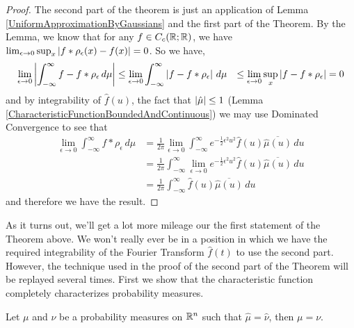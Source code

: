 \begin{proof}
The second part of the theorem is just an application of Lemma
\ref{UniformApproximationByGaussians} and the first part of the
Theorem.  By the Lemma, we know that for any $f \in C_c(\mathbb{R};
\mathbb{R})$, we have $\lim_{\epsilon \to 0} \sup_x
\left \vert f*\rho_\epsilon (x) - f(x) \right \vert = 0$.  So we have, 
\begin{align*}
\lim_{\epsilon \to 0} \left \vert \int_{-\infty}^\infty f - f*\rho_\epsilon
  \, d\mu \right \vert &\leq \lim_{\epsilon \to 0} \int_{-\infty}^\infty \left \vert  f -
  f*\rho_\epsilon \right \vert \, d\mu &\leq \lim_{\epsilon \to 0} \sup_x \left \vert  f -
  f*\rho_\epsilon \right \vert = 0 \\
\end{align*}
and by integrability of $\hat{f}(u)$, the fact that
$\left \vert \hat{\mu} \right \vert \leq 1$ (Lemma \ref{CharacteristicFunctionBoundedAndContinuous}) we may use Dominated Convergence
to see that 
\begin{align*}
\lim_{\epsilon \to 0} \int_{-\infty}^\infty f*\rho_\epsilon  \, d\mu
&= \frac{1}{2\pi} \lim_{\epsilon \to 0} \int_{-\infty}^\infty
e^{-\frac{1}{2}\epsilon^2 u^2} \hat{f}(u) \overline{\hat{\mu}(u)} \,
du \\
&= \frac{1}{2\pi}\int_{-\infty}^\infty  \lim_{\epsilon \to 0} 
e^{-\frac{1}{2}\epsilon^2 u^2} \hat{f}(u) \overline{\hat{\mu}(u)} \,
du \\
&=\frac{1}{2\pi}\int_{-\infty}^\infty  \hat{f}(u)
\overline{\hat{\mu}(u)} \, du 
\end{align*}
and therefore we have the result.
\end{proof}
As it turns out, we'll get a lot more mileage our the first statement
of the Theorem above.  We won't really ever be in a position in which
we have the required integrability of the Fourier Transform
$\hat{f}(t)$ to use the second part.  However, the technique used in the proof
of the second part of the Theorem will be replayed several times.
First we show that the characteristic function completely
characterizes probability measures.
\begin{thm}\label{EqualCharacteristicFunctionEqualMeasures} Let $\mu$ and $\nu$ be a probability measures on
  $\mathbb{R}^n$ such that $\hat{\mu} = \hat{\nu}$, then $\mu=\nu$.
\end{thm}
